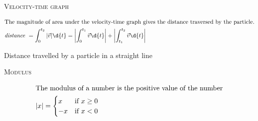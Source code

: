 \documentclass{article}
\begin{document}
    \begin{center}
        \textsc{Velocity-time graph}
    \end{center}
    \begin{center}
    \end{center}
    \begin{align*}
        \intertext{The magnitude of area under the velocity-time graph gives the distance traversed by the particle.}
        \textit{distance } &= \int_{0}^{t_2} |\vec{v}|\d{t} = \left|\int_{0}^{t_1} \vec{v}\d{t}\right| + \left|\int_{t_1}^{t_2} \vec{v}\d{t}\right|\\
    \end{align*}

    Distance travelled by a particle in a straight line
    \begin{center}
    \end{center}

    \begin{center}
        \textsc{Modulus}
    \end{center}
    \begin{align*}
        \intertext{The modulus of a number is the positive value of the number}
        |x| &= \begin{cases}
            x & \text{if } x \geq 0\\
            -x & \text{if } x < 0
        \end{cases}
    \end{align*}



\pagebreak 
\end{document}
